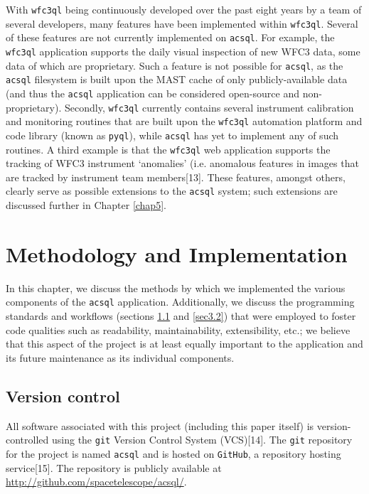 \documentclass[10pt,journal,compsoc]{IEEEtran}
\begin{document}
With \texttt{wfc3ql} being continuously developed over the past eight years by a team of several developers, many features have been implemented within \texttt{wfc3ql}.  Several of
these features are not currently implemented on \texttt{acsql}.  For example, the \texttt{wfc3ql} application supports the daily visual inspection of new WFC3 data, some data of which
are proprietary.  Such a feature is not possible for \texttt{acsql}, as the \texttt{acsql} filesystem is built upon the MAST cache of only publicly-available data (and thus the \texttt{acsql}
application can be considered open-source and non-proprietary).  Secondly, \texttt{wfc3ql} currently contains several instrument calibration and monitoring routines that are built upon
the \texttt{wfc3ql} automation platform and code library (known as \texttt{pyql}), while \texttt{acsql} has yet to implement any of such routines.  A third example is that the \texttt{wfc3ql}
web application supports the tracking of WFC3 instrument `anomalies' (i.e. anomalous features in images that are tracked by instrument team members[13]. These features, amongst others,
clearly serve as possible extensions to the \texttt{acsql} system; such extensions are discussed further in Chapter \ref{chap5}.


\section{Methodology and Implementation} \label{chap3}

In this chapter, we discuss the methods by which we implemented the various components of the \texttt{acsql} application.  Additionally, we discuss the programming standards and
workflows (sections \ref{sec3.1} and \ref{sec3.2}) that were employed to foster code qualities such as readability, maintainability, extensibility, etc.; we believe that this aspect
of the project is at least equally important to the application and its future maintenance as its individual components.


\subsection{Version control} \label{sec3.1}

All software associated with this project (including this paper itself) is version-controlled using the \texttt{git} Version Control System (VCS)[14]. The \texttt{git} repository for the
project is named \texttt{acsql} and is hosted on \texttt{GitHub}, a repository hosting service[15].  The repository is publicly available at
\textcolor{blue}{\url{http://github.com/spacetelescope/acsql/}}.
\end{document}
